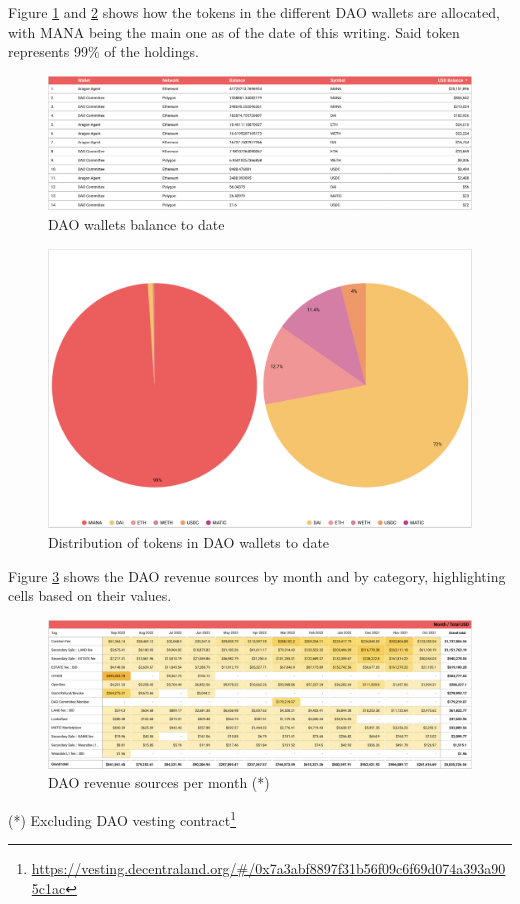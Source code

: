 \documentclass[MSE,Master,english]{twbook}%
\begin{document}
Figure \ref{fig:dao_balance} and \ref{fig:token_distribution} shows how the tokens in the different DAO wallets are allocated, with MANA being the main one as of the date of this writing. Said token represents 99\% of the holdings.
\begin{figure}[H]
  \centering
  \includegraphics[width=\textwidth]{metrics/dao_balance.png}
  \caption{DAO wallets balance to date}
  \label{fig:dao_balance}
\end{figure}
\begin{figure}[H]
  \centering
  \includegraphics[width=\textwidth]{metrics/token_distribution.png}
  \caption{Distribution of tokens in DAO wallets to date}
  \label{fig:token_distribution}
\end{figure}

Figure \ref{fig:income} shows the DAO revenue sources by month and by category, highlighting cells based on their values.
\begin{figure}[H]
  \centering
  \includegraphics[width=\textwidth]{metrics/income.png}
  \caption{DAO revenue sources per month (*)}
  \label{fig:income}
\end{figure}
(*) Excluding DAO vesting contract\footnote{\url{https://vesting.decentraland.org/\#/0x7a3abf8897f31b56f09c6f69d074a393a905c1ac}}
\end{document}
